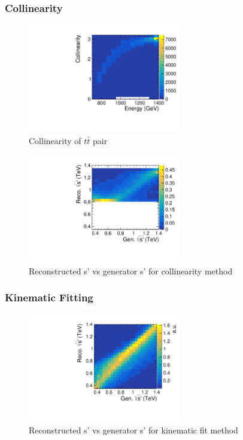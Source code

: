 \subsubsection{Collinearity}

\begin{figure}
  \centering
  \includegraphics[width=0.6\textwidth]{TopAnalysis/figures/ColVsE.pdf}
  \caption[Collinearity of $t\bar{t}$ pair]{Collinearity of $t\bar{t}$ pair}
  \label{fig:Collinearity}
\end{figure}

\begin{figure}
  \centering
  \includegraphics[width=0.6\textwidth]{TopAnalysis/figures/ColEVsTrueE.pdf}
  \caption[Reconstructed s' vs generator s' for collinearity method]{Reconstructed s' vs generator s' for collinearity method}
  \label{fig:CollinearitySPrime}
\end{figure}

\subsubsection{Kinematic Fitting}

\begin{figure}
  \centering
  \includegraphics[width=0.6\textwidth]{TopAnalysis/figures/KinEVsTrueE.pdf}
  \caption[Reconstructed s' vs generator s' for kinematic fit  method]{Reconstructed s' vs generator s' for kinematic fit method}
  \label{fig:KinFit}
\end{figure}



